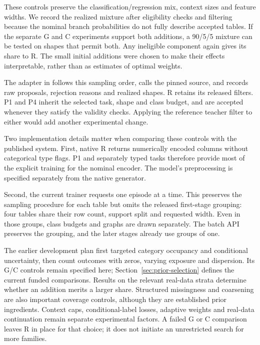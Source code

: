 \documentclass[11pt]{article}
\begin{document}
These controls preserve the classification/regression mix, context sizes and feature widths. We record the realized mixture after eligibility checks and filtering because the nominal branch probabilities do not fully describe accepted tables. If the separate G and C experiments support both additions, a 90/5/5 mixture can be tested on shapes that permit both. Any ineligible component again gives its share to R. The small initial additions were chosen to make their effects interpretable, rather than as estimates of optimal weights.

The adapter in  follows this sampling order, calls the pinned source, and records raw proposals, rejection reasons and realized shapes. R retains its released filters. P1 and P4 inherit the selected task, shape and class budget, and are accepted whenever they satisfy the validity checks. Applying the reference teacher filter to either would add another experimental change.

Two implementation details matter when comparing these controls with the published system. First, native R returns numerically encoded columns without categorical type flags. P1 and separately typed tasks therefore provide most of the explicit training for the nominal encoder. The model's preprocessing is specified separately from the native generator.

Second, the current trainer requests one episode at a time. This preserves the sampling procedure for each table but omits the released first-stage grouping: four tables share their row count, support split and requested width. Even in those groups, class budgets and graphs are drawn separately. The batch API preserves the grouping, and the later stages already use groups of one.

The earlier development plan first targeted category occupancy and conditional uncertainty, then count outcomes with zeros, varying exposure and dispersion. Its G/C controls remain specified here; Section~\ref{sec:prior-selection} defines the current funded comparisons. Results on the relevant real-data strata determine whether an addition merits a larger share. Structured missingness and coarsening are also important coverage controls, although they are established prior ingredients. Context caps, conditional-label losses, adaptive weights and real-data continuation remain separate experimental factors. A failed G or C comparison leaves R in place for that choice; it does not initiate an unrestricted search for more families.
\end{document}
